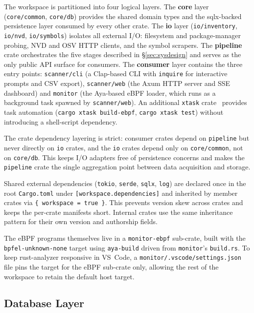 \documentclass[conference]{IEEEtran}
\begin{document}
The workspace is partitioned into four logical layers.
The \textbf{core} layer (\texttt{core/common}, \texttt{core/db}) provides the shared domain types and the sqlx-backed persistence layer consumed by every other crate.
The \textbf{io} layer (\texttt{io/inventory}, \texttt{io/nvd}, \texttt{io/symbols}) isolates all external I/O: filesystem and package-manager probing, NVD and OSV HTTP clients, and the symbol scrapers.
The \textbf{pipeline} crate orchestrates the five stages described in \S\ref{sec:sysdesign} and serves as the only public API surface for consumers.
The \textbf{consumer} layer contains the three entry points: \texttt{scanner/cli} (a Clap-based CLI with \texttt{inquire} for interactive prompts and CSV export), \texttt{scanner/web} (the Axum HTTP server and SSE dashboard) and \texttt{monitor} (the Aya-based eBPF loader, which runs as a background task spawned by \texttt{scanner/web}).
An additional \texttt{xtask} crate~\cite{xtask} provides task automation (\texttt{cargo xtask build-ebpf}, \texttt{cargo xtask test}) without introducing a shell-script dependency.

The crate dependency layering is strict: consumer crates depend on \texttt{pipeline} but never directly on \texttt{io} crates, and the \texttt{io} crates depend only on \texttt{core/common}, not on \texttt{core/db}.
This keeps I/O adapters free of persistence concerns and makes the \texttt{pipeline} crate the single aggregation point between data acquisition and storage.

Shared external dependencies (\texttt{tokio}, \texttt{serde}, \texttt{sqlx}, \texttt{log}) are declared once in the root \texttt{Cargo.toml} under \texttt{[workspace.dependencies]} and inherited by member crates via \texttt{\{ workspace = true \}}.
This prevents version skew across crates and keeps the per-crate manifests short.
Internal crates use the same inheritance pattern for their own version and authorship fields.

The eBPF programs themselves live in a \texttt{monitor-ebpf} sub-crate, built with the \texttt{bpfel-unknown-none} target using \texttt{aya-build} driven from \texttt{monitor}'s \texttt{build.rs}.
To keep rust-analyzer responsive in VS~Code, a \texttt{monitor/.vscode/settings.json} file pins the target for the eBPF sub-crate only, allowing the rest of the workspace to retain the default host target.

\subsection{Database Layer}
\label{sec:database}
\end{document}
